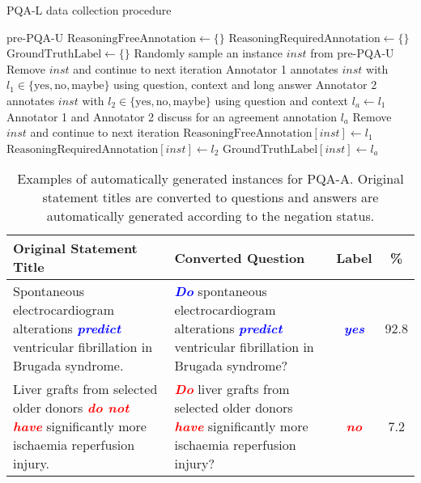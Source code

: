 \documentclass[11pt,a4paper]{article}
\begin{document}
\begin{algorithm}[t]
\small
    \caption{PQA-L data collection procedure}
    \label{algo:pqal}
\begin{algorithmic}
     pre-PQA-U
    \STATE $\text{ReasoningFreeAnnotation} \gets \{\}$
    \STATE $\text{ReasoningRequiredAnnotation} \gets \{\}$
    \STATE $\text{GroundTruthLabel} \gets \{\}$    
        \STATE Randomly sample an instance $inst$ from pre-PQA-U
            \STATE Remove $inst$ and continue to next iteration
        \ENDIF
        \STATE Annotator 1 annotates $inst$  with $l_1 \in \{\text{yes}, \text{no}, \text{maybe}\}$ using question, context and long answer
        \STATE Annotator 2 annotates $inst$ with $l_2 \in \{\text{yes}, \text{no}, \text{maybe}\}$ using question and context
            \STATE $l_a \gets l_1$
        \ELSE
            \STATE Annotator 1 and Annotator 2 discuss for an agreement annotation $l_a$
                \STATE Remove $inst$ and continue to next iteration
            \ENDIF
        \ENDIF
        \STATE $\text{ReasoningFreeAnnotation}[inst] \gets l_1$
        \STATE $\text{ReasoningRequiredAnnotation}[inst] \gets l_2$
        \STATE $\text{GroundTruthLabel}[inst] \gets l_a$
    \ENDWHILE
\end{algorithmic}
\end{algorithm}
\vspace{-0.5em}

\begin{table*}[!t]
\centering
\small
\begin{tabular}{p{6.5cm}p{6.5cm}cc}
\toprule
\textbf{Original Statement Title} & \textbf{Converted Question} & \textbf{Label} & \textbf{\%}\\
\midrule
Spontaneous electrocardiogram alterations \textit{\textbf{\textcolor{blue}{predict}}} ventricular fibrillation in Brugada syndrome. & \textit{\textbf{\textcolor{blue}{Do}}} spontaneous electrocardiogram alterations \textit{\textbf{\textcolor{blue}{predict}}} ventricular fibrillation in Brugada syndrome? & \textit{\textbf{\textcolor{blue}{yes}}} & 92.8 \\
\midrule
Liver grafts from selected older donors \textit{\textbf{\textcolor{red}{do not have}}} significantly more ischaemia reperfusion injury. & \textit{\textbf{\textcolor{red}{Do}}} liver grafts from selected older donors \textit{\textbf{\textcolor{red}{have}}} significantly more ischaemia reperfusion injury? & \textit{\textbf{\textcolor{red}{no}}} & 7.2 \\
\bottomrule
\end{tabular}
\caption{Examples of automatically generated instances for PQA-A. Original statement titles are converted to questions and answers are automatically generated according to the negation status.}
\label{tab:pqaa}
\vspace{-0.5em}
\end{table*}
\end{document}
